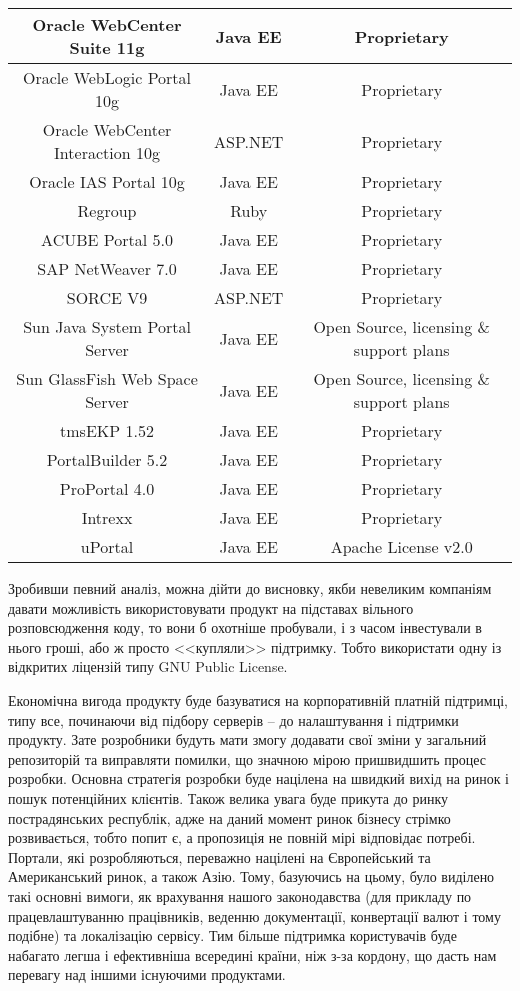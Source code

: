 {\begin{longtable}{|c|c|c|}
 Oracle WebCenter Suite 11g & Java EE & Proprietary \\ \hline
 Oracle WebLogic Portal 10g & Java EE & Proprietary \\ \hline
 Oracle WebCenter Interaction 10g & ASP.NET & Proprietary \\ \hline
 Oracle IAS Portal 10g & Java EE & Proprietary \\ \hline
 Regroup & Ruby & Proprietary \\ \hline
 ACUBE Portal 5.0 & Java EE & Proprietary \\ \hline
 SAP NetWeaver 7.0 & Java EE & Proprietary \\ \hline
 SORCE V9 & ASP.NET & Proprietary \\ \hline
 Sun Java System Portal Server & Java EE & Open Source, licensing \& support plans \\ \hline
 Sun GlassFish Web Space Server  & Java EE & Open Source, licensing \& support plans \\ \hline
 tmsEKP 1.52 & Java EE & Proprietary \\ \hline
 PortalBuilder 5.2 & Java EE & Proprietary \\ \hline
 ProPortal 4.0 & Java EE & Proprietary \\ \hline
 Intrexx & Java EE & Proprietary \\ \hline
 uPortal & Java EE & Apache License v2.0 \\ \hline

\end{longtable}
}


Зробивши певний аналіз, можна дійти до висновку, якби невеликим компаніям давати можливість використовувати продукт на підставах вільного розповсюдження коду, то вони б охотніше пробували, і з часом інвестували в нього гроші, або ж просто <<купляли>> підтримку.
Тобто використати одну із відкритих ліцензій типу GNU Public License.
\par Економічна вигода продукту буде базуватися на корпоративній платній підтримці, типу все, починаючи від підбору серверів -- до налаштування і підтримки продукту.
Зате розробники будуть мати змогу додавати свої зміни у загальний репозиторій та виправляти помилки, що значною мірою пришвидшить процес розробки.
Основна стратегія розробки буде націлена на швидкий вихід на ринок і пошук потенційних клієнтів.
Також велика увага буде прикута до ринку пострадянських республік, адже на даний момент ринок бізнесу стрімко розвивається, тобто попит є, а пропозиція не повній мірі відповідає потребі.
Портали, які розробляються, переважно націлені на Європейський та Американський ринок, а також Азію.
Тому, базуючись на цьому, було виділено такі основні вимоги, як врахування нашого законодавства (для прикладу по працевлаштуванню працівників, веденню документації, конвертації валют і тому подібне) та локалізацію сервісу.
Тим більше підтримка користувачів буде набагато легша і ефективніша всередині країни, ніж з-за кордону, що дасть нам перевагу над іншими існуючими продуктами.

